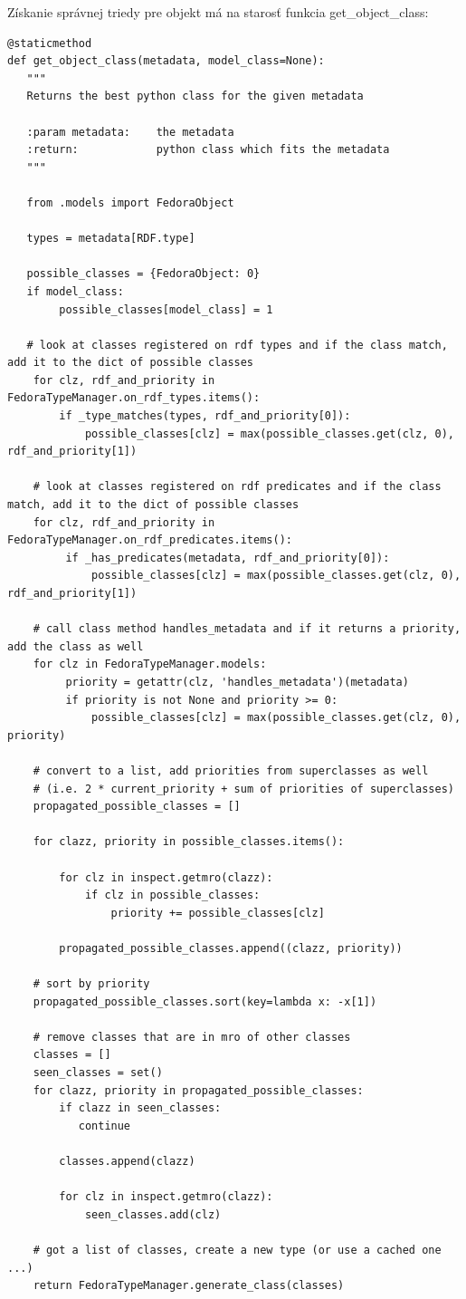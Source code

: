 \documentclass[thesis=M,slovak]{FITthesis}[2013/05/06]
\begin{document}
Získanie správnej triedy pre objekt má na starosť funkcia get\_object\_class:
\begin{lstlisting}[frame=single] 
@staticmethod
def get_object_class(metadata, model_class=None):
   """
   Returns the best python class for the given metadata

   :param metadata:    the metadata
   :return:            python class which fits the metadata
   """

   from .models import FedoraObject

   types = metadata[RDF.type]

   possible_classes = {FedoraObject: 0}
   if model_class:
        possible_classes[model_class] = 1

   # look at classes registered on rdf types and if the class match, add it to the dict of possible classes
    for clz, rdf_and_priority in FedoraTypeManager.on_rdf_types.items():
        if _type_matches(types, rdf_and_priority[0]):
            possible_classes[clz] = max(possible_classes.get(clz, 0), rdf_and_priority[1])

    # look at classes registered on rdf predicates and if the class match, add it to the dict of possible classes
    for clz, rdf_and_priority in FedoraTypeManager.on_rdf_predicates.items():
         if _has_predicates(metadata, rdf_and_priority[0]):
             possible_classes[clz] = max(possible_classes.get(clz, 0), rdf_and_priority[1])

    # call class method handles_metadata and if it returns a priority, add the class as well
    for clz in FedoraTypeManager.models:
         priority = getattr(clz, 'handles_metadata')(metadata)
         if priority is not None and priority >= 0:
             possible_classes[clz] = max(possible_classes.get(clz, 0), priority)

    # convert to a list, add priorities from superclasses as well
    # (i.e. 2 * current_priority + sum of priorities of superclasses)
    propagated_possible_classes = []

    for clazz, priority in possible_classes.items():

        for clz in inspect.getmro(clazz):
            if clz in possible_classes:
                priority += possible_classes[clz]

        propagated_possible_classes.append((clazz, priority))

    # sort by priority
    propagated_possible_classes.sort(key=lambda x: -x[1])

    # remove classes that are in mro of other classes
    classes = []
    seen_classes = set()
    for clazz, priority in propagated_possible_classes:
        if clazz in seen_classes:
           continue

        classes.append(clazz)

        for clz in inspect.getmro(clazz):
            seen_classes.add(clz)

    # got a list of classes, create a new type (or use a cached one ...)
    return FedoraTypeManager.generate_class(classes)
\end{lstlisting}
\end{document}
